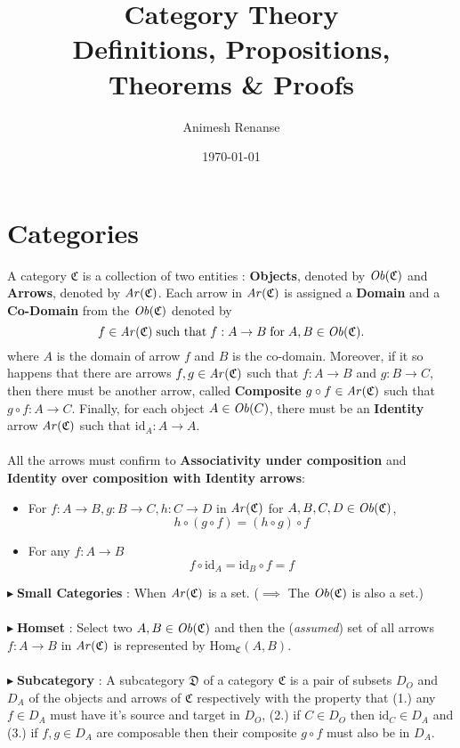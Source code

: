 \documentclass{article}
\title{Category Theory\\%
	\large Definitions, Propositions, Theorems \& Proofs}
\author{Animesh Renanse}
\date{\today}
\theoremstyle{definition}
\theoremstyle{remark}
\theoremstyle{definition}
\theoremstyle{definition}
\theoremstyle{definition}
\newcommand{\cat}[1]{\mathfrak{#1}}
\newcommand{\obj}[1]{\text{\textit{Ob}}(#1)}
\newcommand{\arr}[1]{\text{\textit{Ar}}(#1)}
\newcommand{\Id}[1]{\text{id}_{#1}}
\newcommand{\homset}[3]{\text{Hom}_{#1}(#2,#3)}
\newcommand{\point}[0]{$\blacktriangleright\;$}
\begin{document}
	
	\maketitle
	\tableofcontents
\section{Categories}
A category $ \cat{C} $ is a collection of two entities : \textbf{Objects}, denoted by $ \obj{\cat{C}} $ and \textbf{Arrows}, denoted by $ \arr{\cat{C}} $. Each arrow in $ \arr{\cat{C}} $ is assigned a \textbf{Domain} and a \textbf{Co-Domain} from the $ \obj{\cat{C}} $ denoted by
\[f \in \arr{\cat{C}} \;\text{such that}\;f : A \to B\;\text{for}\;A,B\in \obj{\cat{C}}.\]
where $ A $ is the domain of arrow $ f $ and $ B $ is the co-domain. Moreover, if it so happens that there are arrows $ f,g\in \arr{\cat{C}} $ such that $ f : A \to B$ and $ g : B\to C $, then there must be another arrow, called \textbf{Composite} $ g\circ f \in \arr{\cat{C}}$ such that $ g\circ f : A\to C $. Finally, for each object $A\in \obj{C} $, there must be an \textbf{Identity} arrow $ \arr{\cat{C}} $ such that $ \Id{A} : A\to A $.\\\\
All the arrows must confirm to \textbf{Associativity under composition} and \textbf{Identity over composition with Identity arrows}:
\begin{itemize}
	\item{For $ f : A\to B,g : B\to C, h : C\to D $ in $ \arr{\cat{C}} $ for $ A,B,C,D \in \obj{\cat{C}} $,
\[h\circ (g\circ f) = (h\circ g)\circ f\]	
}
\item{For any $ f : A\to B $ 
\[f\circ \Id{A} = \Id{B}\circ f = f\]
}
\end{itemize}
\point\textbf{Small Categories} : When $ \arr{\cat{C}} $ is a set. ($ \implies $ The $ \obj{\cat{C}} $ is also a set.)\\\\
\point\textbf{Homset} : Select two $ A,B\in \obj{\cat{C}} $ and then the (\textit{assumed}) set of all arrows $ f : A\to B $ in $ \arr{\cat{C}} $ is represented by $ \homset{\cat{C}}{A}{B} $.\\\\
\point\textbf{Subcategory} : A subcategory $ \cat{D} $ of a category $ \cat{C} $ is a pair of subsets $ D_O $ and $ D_A $ of the objects and arrows of $ \cat{C} $ respectively with the property that (1.) any $ f\in D_A $ must have it's source and target in $ D_O $, (2.) if $ C\in D_O $ then $ \Id{C}\in D_A $ and (3.) if $ f,g \in D_A$ are composable then their composite $ g\circ f $ must also be in $D_A$.\\\\
\end{document}
